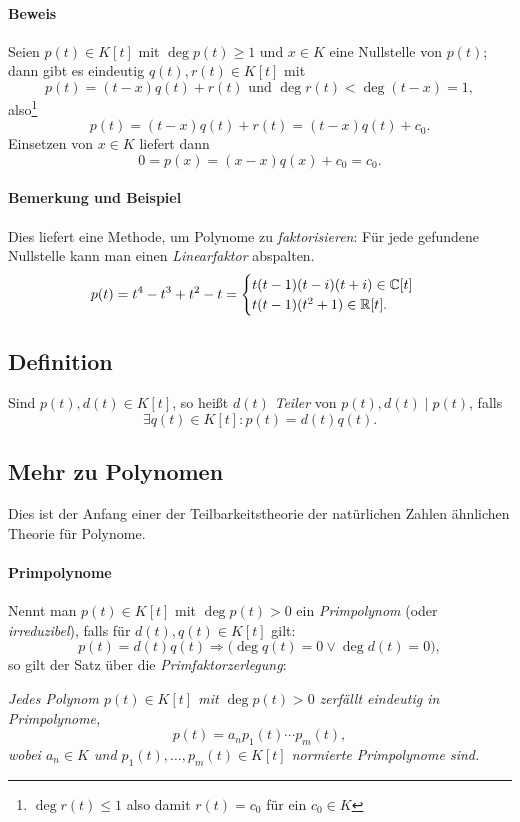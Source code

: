 \paragraph{Beweis}
	Seien $ p(t)\in K[t] $ mit $ \deg p(t) \geq 1 $ und $ x\in K $ eine Nullstelle von $ p(t) $; dann gibt es eindeutig $ q(t),r(t) \in K[t] $ mit
		\[ p(t) = (t-x) q(t) + r(t) \text{ und } \deg r(t) < \deg (t-x) = 1, \]
	also\footnote{$\deg r(t)\leq 1$ also damit $r(t)=c_0$ für ein $c_0\in K$}
		\[ p(t) = (t-x)q(t)+r(t) = (t-x)q(t)+c_0. \]
	Einsetzen von $ x\in K $ liefert dann
		\[ 0 = p(x) = (x-x)q(x) + c_0 = c_0. \]
\paragraph{Bemerkung und Beispiel}
	Dies liefert eine Methode, um Polynome zu \emph{faktorisieren}: Für jede gefundene Nullstelle kann man einen \emph{Linearfaktor} abspalten.
		\[ p(t)= t^4-t^3+t^2-t =
			\begin{cases}
				t(t-1)(t-i)(t+i) \in \mathbb{C}[t]\\
				t(t-1)(t^2+1) \in \mathbb{R}[t].
			\end{cases} \]

\subsection{Definition}
	\begin{Definition}[Teiler]
		Sind $ p(t),d(t)\in K[t] $, so heißt $ d(t) $ \emph{Teiler} von $ p(t), d(t)\mid p(t) $, falls
			\[ \exists q(t)\in K[t]: p(t)= d(t)q(t). \]
	\end{Definition}

\subsection{Mehr zu Polynomen}
	Dies ist der Anfang einer der Teilbarkeitstheorie der natürlichen Zahlen ähnlichen Theorie für Polynome.
	
\paragraph{Primpolynome}
\begin{Definition}[Primpolynom]
	Nennt man $ p(t)\in K[t] $ mit $ \deg p(t) > 0$ ein \emph{Primpolynom} (oder \emph{irreduzibel}), falls für $ d(t),q(t)\in K[t] $ gilt:
		\[ p(t)= d(t)q(t) \Rightarrow \Big( \deg q(t)=0 \lor \deg d(t) = 0 \Big), \]
	so gilt der Satz über die \emph{Primfaktorzerlegung}:
\end{Definition}
	\begin{Satz}[Primfaktorzerlegung]
	\begin{addmargin}{1cm}
		\textit{Jedes Polynom $ p(t)\in K[t] $ mit $ \deg p(t)>0 $ zerfällt eindeutig in Primpolynome,
			\[ p(t) = a_n p_1(t) \cdots p_m(t), \]
		wobei $ a_n\in K $ und $ p_1(t),\dots,p_m(t)\in K[t] $ normierte Primpolynome sind.}
	\end{addmargin}
	\end{Satz}
	
